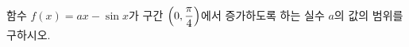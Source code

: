 함수 $f(x)=ax-\sin x$가 구간 $\left(0{,}\mkern3mu\mathopen{}\dfrac{\pi}{4}\right)$에서 증가하도록 하는 실수 $a$의 값의 범위를 구하시오.
